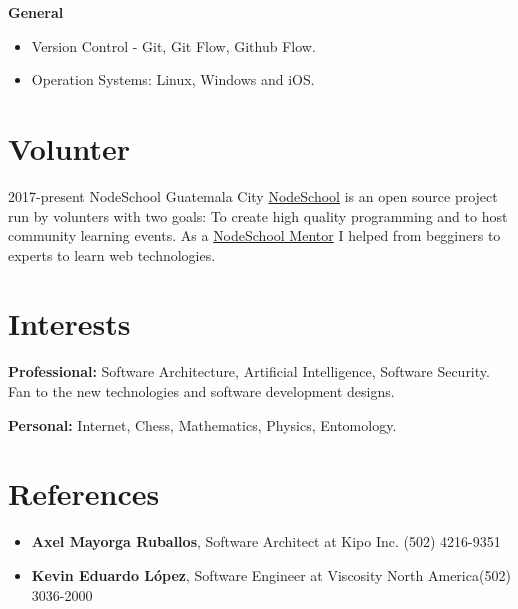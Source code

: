 \documentclass[]{friggeri-cv} %
\begin{document}
\textbf{General}
\begin{itemize}
	\item Version Control - Git, Git Flow, Github Flow.
	\item Operation Systems: Linux, Windows and iOS.
\end{itemize}

\section{Volunter}
\begin{entrylist}
\entry
	{2017-present}
	{NodeSchool}
	{Guatemala City}
	{\href{https://nodeschool.io}{NodeSchool} is an open source project run by volunters with two goals: To create high quality
	programming and to host community learning events. As a \href{https://nodeschool.io/guatemala/}{NodeSchool Mentor}
	I helped from begginers to experts to learn web technologies.}
\end{entrylist}

\section{Interests}

\textbf{Professional:} Software Architecture, Artificial Intelligence, Software Security. Fan to the new technologies and software development designs.

\textbf{Personal:} Internet, Chess, Mathematics, Physics, Entomology.

\section{References}

\begin{itemize}
	\item \noindent \textbf{Axel Mayorga Ruballos},  Software Architect at Kipo Inc. \hfill \hfill (502) 4216-9351
	\item \noindent \textbf{Kevin Eduardo López}, Software Engineer at Viscosity North America\hfill \hfill (502) 3036-2000
\end{itemize}
\end{document}
